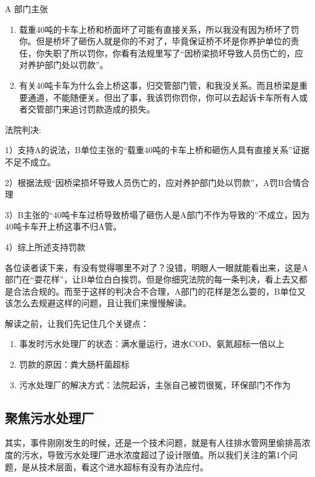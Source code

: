 \documentclass[
]{book}
\begin{document}
A 部门主张

\begin{enumerate}
\def\labelenumi{\arabic{enumi}.}
\item
  载重40吨的卡车上桥和桥面坏了可能有直接关系，所以我没有因为桥坏了罚你。但是桥坏了砸伤人就是你的不对了，毕竟保证桥不坏是你养护单位的责任，你失职了所以罚你，你看有法规里写了``因桥梁损坏导致人员伤亡的，应对养护部门处以罚款''。
\item
  有关40吨卡车为什么会上桥这事，归交管部门管，和我没关系。而且桥梁是重要通道，不能随便关。但出了事，我该罚你罚你，你可以去起诉卡车所有人或者交管部门来追讨罚款造成的损失。
\end{enumerate}

法院判决:

1）支持A的说法，B单位主张的``载重40吨的卡车上桥和砸伤人具有直接关系''证据不足不成立。

2）根据法规``因桥梁损坏导致人员伤亡的，应对养护部门处以罚款''，A罚B合情合理

3）B主张的``40吨卡车过桥导致桥塌了砸伤人是A部门不作为导致的''不成立，因为40吨卡车开上桥这事不归A管。

4）综上所述支持罚款

各位读者读下来，有没有觉得哪里不对了？没错，明眼人一眼就能看出来，这是A部门在``耍花样''，让B单位白白挨罚。但是你细究法院的每一条判决，看上去又都是合法合规的。而至于这样的判决合不合理，A部门的花样是怎么耍的，B单位又该怎么去规避这样的问题，且让我们来慢慢解读。

解读之前，让我们先记住几个关键点：

\begin{enumerate}
\def\labelenumi{\arabic{enumi}.}
\item
  事发时污水处理厂的状态：满水量运行，进水COD、氨氮超标一倍以上
\item
  罚款的原因：粪大肠杆菌超标
\item
  污水处理厂的解决方式：法院起诉，主张自己被罚很冤，环保部门不作为
\end{enumerate}

\hypertarget{ux805aux7126ux6c61ux6c34ux5904ux7406ux5382}{%
\subsection{聚焦污水处理厂}\label{ux805aux7126ux6c61ux6c34ux5904ux7406ux5382}}

其实，事件刚刚发生的时候，还是一个技术问题，就是有人往排水管网里偷排高浓度的污水，导致污水处理厂进水浓度超过了设计限值。所以我们关注的第1个问题，是从技术层面，看这个进水超标有没有办法应付。
\end{document}
